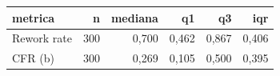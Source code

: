 \begin{tabular}{lrrrrr}
\hline
metrica & n & mediana & q1 & q3 & iqr \\
\hline
Rework rate & 300 & 0,700 & 0,462 & 0,867 & 0,406 \\
CFR (b) & 300 & 0,269 & 0,105 & 0,500 & 0,395 \\
\hline
\end{tabular}
